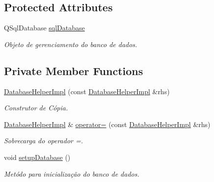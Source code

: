 \subsection*{Protected Attributes}
\begin{DoxyCompactItemize}
\item 
Q\+Sql\+Database \hyperlink{classDatabaseHelperImpl_a0bc1ee11321daa34b2abe7306c6184c2}{sql\+Database}\hypertarget{classDatabaseHelperImpl_a0bc1ee11321daa34b2abe7306c6184c2}{}\label{classDatabaseHelperImpl_a0bc1ee11321daa34b2abe7306c6184c2}

\begin{DoxyCompactList}\small\item\em Objeto de gerenciamento do banco de dados. \end{DoxyCompactList}\end{DoxyCompactItemize}
\subsection*{Private Member Functions}
\begin{DoxyCompactItemize}
\item 
\hyperlink{classDatabaseHelperImpl_a88e80bd1c92b35e3e8a4fe1238215245}{Database\+Helper\+Impl} (const \hyperlink{classDatabaseHelperImpl}{Database\+Helper\+Impl} \&rhs)
\begin{DoxyCompactList}\small\item\em Construtor de Cópia. \end{DoxyCompactList}\item 
\hyperlink{classDatabaseHelperImpl}{Database\+Helper\+Impl} \& \hyperlink{classDatabaseHelperImpl_a165437593ebfabea3bdaf342d339d0cc}{operator=} (const \hyperlink{classDatabaseHelperImpl}{Database\+Helper\+Impl} \&rhs)
\begin{DoxyCompactList}\small\item\em Sobrecarga do operador =. \end{DoxyCompactList}\item 
void \hyperlink{classDatabaseHelperImpl_af1b1b1496a9027cd09ee0456010ad9bd}{setup\+Database} ()
\begin{DoxyCompactList}\small\item\em Metódo para inicialização do banco de dados. \end{DoxyCompactList}\end{DoxyCompactItemize}
